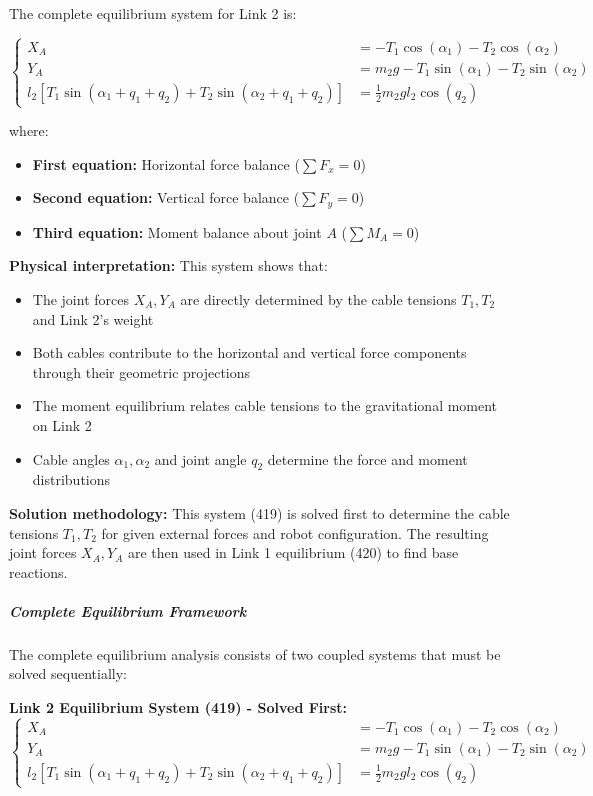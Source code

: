 The complete equilibrium system for Link 2 is:

\begin{equation}
\left\{
\begin{aligned}
X_A &= -T_1 \cos(\alpha_1) - T_2 \cos(\alpha_2) \\
Y_A &= m_2 g - T_1 \sin(\alpha_1) - T_2 \sin(\alpha_2) \\
l_2[T_1 \sin(\alpha_1 + q_1 + q_2) + T_2 \sin(\alpha_2 + q_1 + q_2)] &= \frac{1}{2}m_2 g l_2 \cos(q_2)
\end{aligned}
\right.
\tag{419}
\end{equation}

where:
\begin{itemize}
    \item \textbf{First equation:} Horizontal force balance ($\sum F_x = 0$)
    \item \textbf{Second equation:} Vertical force balance ($\sum F_y = 0$)  
    \item \textbf{Third equation:} Moment balance about joint $A$ ($\sum M_A = 0$)
\end{itemize}

\textbf{Physical interpretation:} This system shows that:
\begin{itemize}
    \item The joint forces $X_A, Y_A$ are directly determined by the cable tensions $T_1, T_2$ and Link 2's weight
    \item Both cables contribute to the horizontal and vertical force components through their geometric projections
    \item The moment equilibrium relates cable tensions to the gravitational moment on Link 2
    \item Cable angles $\alpha_1, \alpha_2$ and joint angle $q_2$ determine the force and moment distributions
\end{itemize}

\textbf{Solution methodology:} This system (419) is solved first to determine the cable tensions $T_1, T_2$ for given external forces and robot configuration. The resulting joint forces $X_A, Y_A$ are then used in Link 1 equilibrium (420) to find base reactions.

\subparagraph{Complete Equilibrium Framework}

The complete equilibrium analysis consists of two coupled systems that must be solved sequentially:

\textbf{Link 2 Equilibrium System (419) - Solved First:}
\begin{equation}
\left\{
\begin{aligned}
X_A &= -T_1 \cos(\alpha_1) - T_2 \cos(\alpha_2) \\
Y_A &= m_2 g - T_1 \sin(\alpha_1) - T_2 \sin(\alpha_2) \\
l_2[T_1 \sin(\alpha_1 + q_1 + q_2) + T_2 \sin(\alpha_2 + q_1 + q_2)] &= \frac{1}{2}m_2 g l_2 \cos(q_2)
\end{aligned}
\right.
\tag{419}
\end{equation}

